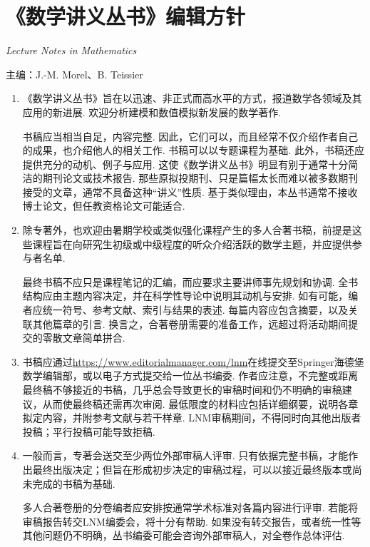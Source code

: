 \clearpage
\section*{《数学讲义丛书》编辑方针}\label{sec:publisher-policy}

\noindent\textit{Lecture Notes in Mathematics}\par
\noindent 主编：J.-M. Morel、B. Teissier

\begin{enumerate}
\item 《数学讲义丛书》旨在以迅速、非正式而高水平的方式，报道数学各领域及其应用的新进展. 欢迎分析建模和数值模拟新发展的数学著作.

书稿应当相当自足，内容完整. 因此，它们可以，而且经常不仅介绍作者自己的成果，也介绍他人的相关工作. 书稿可以以专题课程为基础. 此外，书稿还应提供充分的动机、例子与应用. 这使《数学讲义丛书》明显有别于通常十分简洁的期刊论文或技术报告. 那些原拟投期刊、只是篇幅太长而难以被多数期刊接受的文章，通常不具备这种“讲义”性质. 基于类似理由，本丛书通常不接收博士论文，但任教资格论文可能适合.

\item 除专著外，也欢迎由暑期学校或类似强化课程产生的多人合著书稿，前提是这些课程旨在向研究生初级或中级程度的听众介绍活跃的数学主题，并应提供参与者名单.

最终书稿不应只是课程笔记的汇编，而应要求主要讲师事先规划和协调. 全书结构应由主题内容决定，并在科学性导论中说明其动机与安排. 如有可能，编者应统一符号、参考文献、索引与结果的表述. 每篇内容应包含摘要，以及关联其他篇章的引言. 换言之，合著卷册需要的准备工作，远超过将活动期间提交的零散文章简单拼合.

\item 书稿应通过\url{https://www.editorialmanager.com/lnm}在线提交至Springer海德堡数学编辑部，或以电子方式提交给一位丛书编委. 作者应注意，不完整或距离最终稿不够接近的书稿，几乎总会导致更长的审稿时间和仍不明确的审稿建议，从而使最终稿还需再次审阅. 最低限度的材料应包括详细纲要，说明各章拟定内容，并附参考文献与若干样章. LNM审稿期间，不得同时向其他出版者投稿；平行投稿可能导致拒稿.

\item 一般而言，专著会送交至少两位外部审稿人评审. 只有依据完整书稿，才能作出最终出版决定；但旨在形成初步决定的审稿过程，可以以接近最终版本或尚未完成的书稿为基础.

多人合著卷册的分卷编者应安排按通常学术标准对各篇内容进行评审. 若能将审稿报告转交LNM编委会，将十分有帮助. 如果没有转交报告，或者统一性等其他问题仍不明确，丛书编委可能会咨询外部审稿人，对全卷作总体评估.


\end{enumerate}
